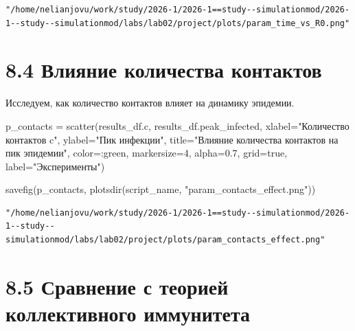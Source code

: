 \documentclass[
  12pt,
  a4paper,
  DIV=11,
  numbers=noendperiod]{scrreprt}
\newenvironment{Shaded}{\begin{snugshade}}{\end{snugshade}}
\newcommand{\ConstantTok}[1]{\textcolor[rgb]{0.56,0.35,0.01}{#1}}
\newcommand{\FloatTok}[1]{\textcolor[rgb]{0.68,0.00,0.00}{#1}}
\newcommand{\FunctionTok}[1]{\textcolor[rgb]{0.28,0.35,0.67}{#1}}
\newcommand{\NormalTok}[1]{\textcolor[rgb]{0.00,0.23,0.31}{#1}}
\newcommand{\OperatorTok}[1]{\textcolor[rgb]{0.37,0.37,0.37}{#1}}
\newcommand{\StringTok}[1]{\textcolor[rgb]{0.13,0.47,0.30}{#1}}
\begin{document}
\begin{verbatim}
"/home/nelianjovu/work/study/2026-1/2026-1==study--simulationmod/2026-1--study--simulationmod/labs/lab02/project/plots/param_time_vs_R0.png"
\end{verbatim}

\section{8.4 Влияние количества
контактов}\label{ux432ux43bux438ux44fux43dux438ux435-ux43aux43eux43bux438ux447ux435ux441ux442ux432ux430-ux43aux43eux43dux442ux430ux43aux442ux43eux432}

Исследуем, как количество контактов влияет на динамику эпидемии.

\begin{Shaded}
\begin{Highlighting}[]
\NormalTok{p\_contacts }\OperatorTok{=} \FunctionTok{scatter}\NormalTok{(results\_df.c, results\_df.peak\_infected,}
\NormalTok{    xlabel}\OperatorTok{=}\StringTok{"Количество контактов c"}\NormalTok{,}
\NormalTok{    ylabel}\OperatorTok{=}\StringTok{"Пик инфекции"}\NormalTok{,}
\NormalTok{    title}\OperatorTok{=}\StringTok{"Влияние количества контактов на пик эпидемии"}\NormalTok{,}
\NormalTok{    color}\OperatorTok{=:}\NormalTok{green,}
\NormalTok{    markersize}\OperatorTok{=}\FloatTok{4}\NormalTok{,}
\NormalTok{    alpha}\OperatorTok{=}\FloatTok{0.7}\NormalTok{,}
\NormalTok{    grid}\OperatorTok{=}\ConstantTok{true}\NormalTok{,}
\NormalTok{    label}\OperatorTok{=}\StringTok{"Эксперименты"}\NormalTok{)}

\FunctionTok{savefig}\NormalTok{(p\_contacts, }\FunctionTok{plotsdir}\NormalTok{(script\_name, }\StringTok{"param\_contacts\_effect.png"}\NormalTok{))}
\end{Highlighting}
\end{Shaded}

\begin{verbatim}
"/home/nelianjovu/work/study/2026-1/2026-1==study--simulationmod/2026-1--study--simulationmod/labs/lab02/project/plots/param_contacts_effect.png"
\end{verbatim}

\section{8.5 Сравнение с теорией коллективного
иммунитета}\label{ux441ux440ux430ux432ux43dux435ux43dux438ux435-ux441-ux442ux435ux43eux440ux438ux435ux439-ux43aux43eux43bux43bux435ux43aux442ux438ux432ux43dux43eux433ux43e-ux438ux43cux43cux443ux43dux438ux442ux435ux442ux430}
\end{document}
